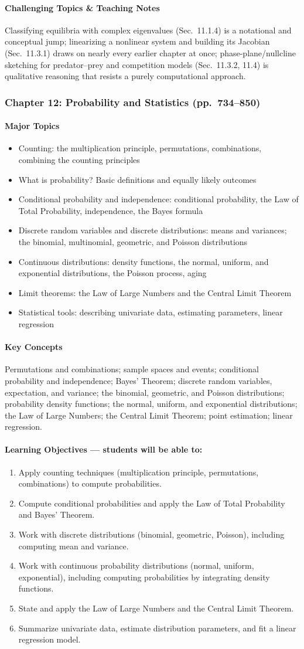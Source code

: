 \documentclass[11pt]{article}
\newcommand{\ChapHead}[2]{\subsubsection{#1 \textnormal{\normalfont\normalsize\color{lightgray}(pp.\ #2)}}}
\newcommand{\MajorTopics}{\paragraph{Major Topics}}
\newcommand{\KeyConcepts}{\paragraph{Key Concepts}}
\newcommand{\LearnObj}{\paragraph{Learning Objectives --- students will be able to:}}
\newcommand{\Hard}{\paragraph{Challenging Topics \& Teaching Notes}}
\begin{document}
\Hard Classifying equilibria with complex eigenvalues (Sec.\ 11.1.4) is a
notational and conceptual jump; linearizing a nonlinear system and building
its Jacobian (Sec.\ 11.3.1) draws on nearly every earlier chapter at once;
phase-plane/nullcline sketching for predator--prey and competition models
(Sec.\ 11.3.2, 11.4) is qualitative reasoning that resists a purely
computational approach.

\bigskip
\ChapHead{Chapter 12: Probability and Statistics}{734--850}

\MajorTopics
\begin{itemize}
\item Counting: the multiplication principle, permutations, combinations, combining the counting principles
\item What is probability? Basic definitions and equally likely outcomes
\item Conditional probability and independence: conditional probability, the Law of Total Probability, independence, the Bayes formula
\item Discrete random variables and discrete distributions: means and variances; the binomial, multinomial, geometric, and Poisson distributions
\item Continuous distributions: density functions, the normal, uniform, and exponential distributions, the Poisson process, aging
\item Limit theorems: the Law of Large Numbers and the Central Limit Theorem
\item Statistical tools: describing univariate data, estimating parameters, linear regression
\end{itemize}

\KeyConcepts
Permutations and combinations; sample spaces and events; conditional
probability and independence; Bayes' Theorem; discrete random variables,
expectation, and variance; the binomial, geometric, and Poisson
distributions; probability density functions; the normal, uniform, and
exponential distributions; the Law of Large Numbers; the Central Limit
Theorem; point estimation; linear regression.

\LearnObj
\begin{enumerate}
\item Apply counting techniques (multiplication principle, permutations, combinations) to compute probabilities.
\item Compute conditional probabilities and apply the Law of Total Probability and Bayes' Theorem.
\item Work with discrete distributions (binomial, geometric, Poisson), including computing mean and variance.
\item Work with continuous probability distributions (normal, uniform, exponential), including computing probabilities by integrating density functions.
\item State and apply the Law of Large Numbers and the Central Limit Theorem.
\item Summarize univariate data, estimate distribution parameters, and fit a linear regression model.
\end{enumerate}
\end{document}
